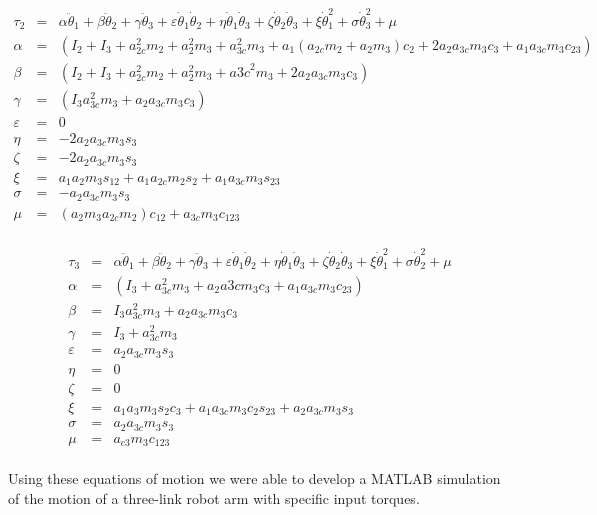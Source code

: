 \documentclass[a4paper]{article}
\begin{document}
\begin{eqnarray*}
\tau_2 & = & \alpha \ddot{\theta}_1 + \beta \ddot{\theta}_2 + \gamma \ddot{\theta}_3 + \varepsilon \dot{\theta}_1 \dot{\theta}_2 + \eta \dot{\theta}_1 \dot{\theta}_3 + \zeta \dot{\theta}_2 \dot{\theta}_3 + \xi \dot{\theta}_1^2 + \sigma \dot{\theta}_3^2 + \mu \\
\alpha & = & (I_2 + I_3 + a_{2c}^2 m_2 + a_2^2 m_3 + a_{3c}^2 m_3 + a_1(a_{2c} m_2 + a_2 m_3)c_2 + 2 a_2 a_{3c} m_3 c_3 + a_1 a_{3c} m_3 c_{23})\\
\beta & = & (I_2 + I_3 + a_{2c}^2 m_2 + a_2^2 m_3 + a{3c}^2 m_3 + 2 a_2 a_{3c} m_3 c_3)\\
\gamma & = & (I_3 a_{3c}^2 m_3 + a_2 a_{3c} m_3 c_3)\\
\varepsilon & = & 0\\
\eta & = & -2 a_2 a_{3c} m_3 s_3\\
\zeta & = & -2 a_2 a_{3c} m_3 s_3 \\
\xi & = & a_1 a_2 m_3 s_{12} + a_1 a_{2c} m_2 s_2 + a_1 a_{3c} m_3s_{23} \\
\sigma & = & -a_2 a_{3c} m_3 s_3\\
\mu & = & (a_2 m_3 a_{2c} m_2) c_{12}+a_{3c} m_3 c_{123}\\
\end{eqnarray*}

\begin{eqnarray*}
\tau_3 & = & \alpha \ddot{\theta}_1 + \beta \ddot{\theta}_2 + \gamma \ddot{\theta}_3 + \varepsilon \dot{\theta}_1 \dot{\theta}_2 + \eta \dot{\theta}_1 \dot{\theta}_3 + \zeta \dot{\theta}_2 \dot{\theta}_3 + \xi \dot{\theta}_1^2 + \sigma \dot{\theta}_2^2 + \mu \\
\alpha & = & (I_3 + a_{3c}^2 m_3 + a_2 a{3c} m_3 c_3 + a_1 a_{3c} m_3 c_{23} )\\
\beta & = & I_3 a_{3c}^2 m_3 + a_2 a_{3c} m_3 c_3\\
\gamma & = & I_3 +a_{3c}^2 m_3\\
\varepsilon & = & a_2 a_{3c} m_3 s_3\\
\eta & = & 0\\
\zeta & = & 0\\
\xi & = & a_1 a_{3} m_3 s_2 c_3 + a_1 a_{3c} m_3 c_2 s_{23} + a_2 a_{3c} m_3 s_3 \\
\sigma & = & a_2 a_{3c} m_3 s_3\\
\mu & = & a_{c3} m_3 c_{123}\\
\end{eqnarray*}

\noindent Using these equations of motion we were able to develop a MATLAB simulation of the motion of a three-link robot arm with  specific input torques.
\end{document}
